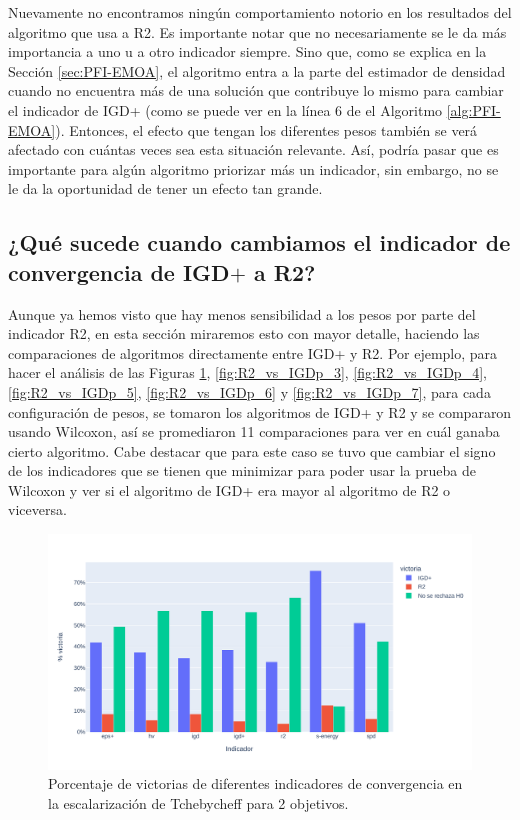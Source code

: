 Nuevamente no encontramos ningún comportamiento notorio en los resultados del algoritmo que usa a R2. Es importante notar que no necesariamente se le da más importancia a uno u a otro indicador siempre. Sino que, como se explica en la Sección \ref{sec:PFI-EMOA}, el algoritmo entra a la parte del estimador de densidad cuando no encuentra más de una solución que contribuye lo mismo para cambiar el indicador de IGD+ (como se puede ver en la línea 6 de el Algoritmo \ref{alg:PFI-EMOA}). Entonces, el efecto que tengan los diferentes pesos también se verá afectado con cuántas veces sea esta situación relevante. Así, podría pasar que es importante para algún algoritmo priorizar más un indicador, sin embargo, no se le da la oportunidad de tener un efecto tan grande.  


\subsection*{¿Qué sucede cuando cambiamos el indicador de convergencia de IGD$+$ a R2?}

Aunque ya hemos visto que hay menos sensibilidad a los pesos por parte del indicador R2, en esta sección miraremos esto con mayor detalle, haciendo las comparaciones de algoritmos directamente entre IGD+ y R2. Por ejemplo, para hacer el análisis de las Figuras \ref{fig:R2_vs_IGDp_2}, \ref{fig:R2_vs_IGDp_3}, \ref{fig:R2_vs_IGDp_4}, \ref{fig:R2_vs_IGDp_5}, \ref{fig:R2_vs_IGDp_6} y \ref{fig:R2_vs_IGDp_7}, para cada configuración de pesos, se tomaron los algoritmos de IGD+ y R2 y se compararon usando Wilcoxon, así se promediaron 11 comparaciones para ver en cuál ganaba cierto algoritmo. Cabe destacar que para este caso se tuvo que cambiar el signo de los indicadores que se tienen que minimizar para poder usar la prueba de Wilcoxon y ver si el algoritmo de IGD+ era mayor al algoritmo de R2 o viceversa.


\begin{figure} [H]
    \centering
\includegraphics[width=\textwidth]{Figuras/R2_vs_IGDp_nobj2.pdf}
\caption[IGD+ vs R2 2 objetivos]{Porcentaje de victorias de diferentes indicadores de convergencia en la escalarización de Tchebycheff para 2 objetivos.}
\label{fig:R2_vs_IGDp_2}
\end{figure}

